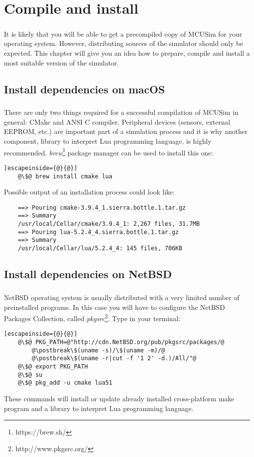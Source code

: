 \chapter{Compile and install} \label{chapter:preparing-binaries}
\paragraph{}
It is likely that you will be able to get a precompiled copy of MCUSim
for your operating system. However, distributing sources of the simulator
should only be expected. This chapter will give you an idea how to prepare,
compile and install a most suitable version of the simulator.

\section{Install dependencies on macOS}
\paragraph{}
There are only two things required for a successful compilation of MCUSim
in general: CMake and ANSI C compiler. Peripheral devices (sensors,
external EEPROM, etc.) are important part of a simulation process and it is
why another component, library to interpret Lua programming language,
is highly recommended.
\emph{brew}\footnote{https://brew.sh/} package manager can be used
to install this one:
\begin{lstlisting}[escapeinside={@}{@}]
	@\$@ brew install cmake lua
\end{lstlisting}
Possible output of an installation process could look like:
\begin{lstlisting}
	==> Pouring cmake-3.9.4_1.sierra.bottle.1.tar.gz
	==> Summary
	/usr/local/Cellar/cmake/3.9.4_1: 2,267 files, 31.7MB
	==> Pouring lua-5.2.4_4.sierra.bottle.1.tar.gz
	==> Summary
	/usr/local/Cellar/lua/5.2.4_4: 145 files, 706KB
\end{lstlisting}

\section{Install dependencies on NetBSD}
\paragraph{}
NetBSD operating system is usually distributed with a very limited number
of preinstalled programs. In this case you will have to configure
the NetBSD Packages Collection, called
\emph{pkgsrc}\footnote{http://www.pkgsrc.org/}. Type in your terminal:
\begin{lstlisting}[escapeinside={@}{@}]
	@\$@ PKG_PATH=@"http://cdn.NetBSD.org/pub/pkgsrc/packages/@
		@\postbreak\$(uname -s)/\$(uname -m)/@
		@\postbreak\$(uname -r|cut -f '1 2' -d.)/All/"@
	@\$@ export PKG_PATH
	@\$@ su
	@\$@ pkg_add -u cmake lua51
\end{lstlisting}
These commands will install or update already installed cross-platform make
program and a library to interpret Lua programming language.

